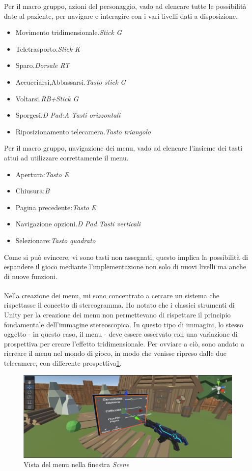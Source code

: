 \documentclass[10pt,a4paper]{article}
\begin{document}
      Per il macro gruppo, azioni del personaggio, vado ad elencare tutte le possibilità date al paziente, per navigare e interagire con i vari livelli dati a disposizione.
     \begin{itemize}
     	\item Movimento tridimensionale.\textit{Stick G}
     	\item Teletrasporto.\textit{Stick K}
     	\item Sparo.\textit{Dorsale RT}
     	\item Accucciarsi,Abbassarsi.\textit{Tasto stick G}
     	\item Voltarsi.\textit{RB+Stick G}
     	\item Sporgesi.\textit{D Pad:A Tasti orizzontali}
     	\item Riposizionamento telecamera.\textit{Tasto triangolo}
     \end{itemize}
     Per il macro gruppo, navigazione dei menu, vado ad elencare l'insieme dei tasti attui ad utilizzare correttamente il menu.
      \begin{itemize}
     	\item Apertura:\textit{Tasto E}
     	\item Chiusura:\textit{B}
     	\item Pagina precedente:\textit{Tasto E}
     	\item Navigazione opzioni.\textit{D Pad Tasti verticali}
     	\item Selezionare:\textit{Tasto quadrato}
     \end{itemize}
     Come si può evincere, vi sono tasti non assegnati, questo implica la possibilità di espandere il gioco mediante l'implementazione non solo di nuovi livelli ma anche di nuove funzioni.\\\\
     Nella creazione dei menu, mi sono concentrato a cercare un sistema che rispettasse il concetto di stereogramma\cite{Stereogramma}. Ho notato che i classici strumenti di Unity per la creazione dei menu non permettevano di rispettare il principio fondamentale dell'immagine stereoscopica. In questo tipo di immagini, lo stesso oggetto - in questo caso, il menu - deve essere osservato con una variazione di prospettiva per creare l'effetto tridimensionale.
     Per ovviare a ciò, sono andato a ricreare il menu nel mondo di gioco, in modo che venisse ripreso dalle due telecamere, con differente prospettiva\ref{fig:menu_scena}.
     \begin{figure}[H]
    	\centering
    	\includegraphics[width=0.8\linewidth]{image/menu_scena}
    	\caption{Vista del menu nella finestra \textit{Scene}}
    	\label{fig:menu_scena}
    \end{figure}
\end{document}
